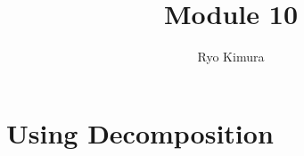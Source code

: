 \documentclass[12pt]{article}
\begin{document}
\title{Module 10}
\author{Ryo Kimura}
\date{}
\maketitle

\section{Using Decomposition}
\end{document}

